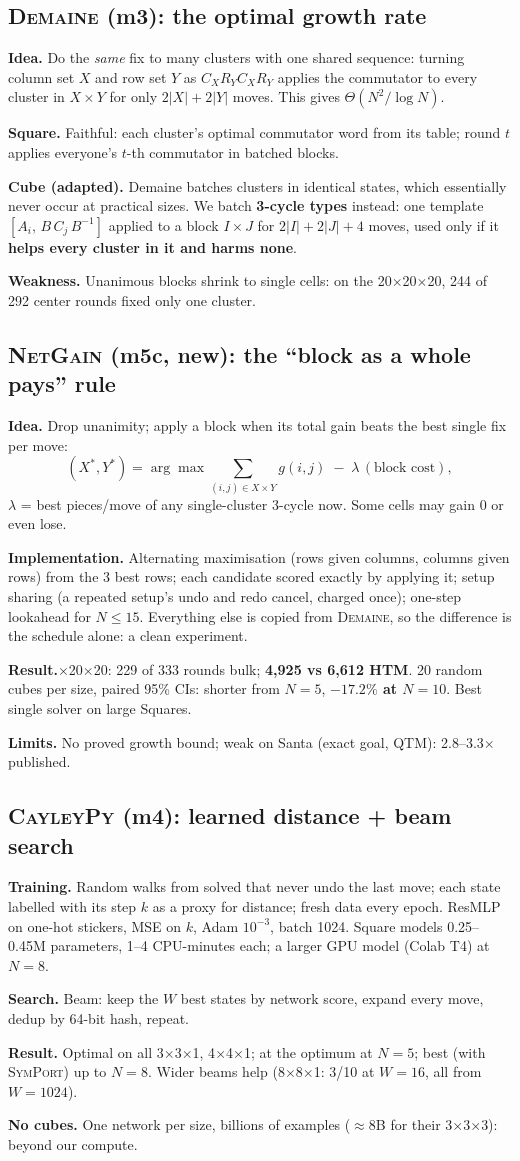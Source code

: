 \documentclass[10.5pt,a4paper]{article}
\newcommand{\Cu}[1]{#1$\times$#1$\times$#1}
\newcommand{\Sq}[1]{#1$\times$#1$\times$1}
\newcommand{\M}[1]{\textsc{#1}}
\newcommand{\sub}[1]{\par\smallskip\textbf{#1}\quad}
\begin{document}
\subsection{\M{Demaine} (m3): the optimal growth rate}
\sub{Idea.} Do the \emph{same} fix to many clusters with one shared sequence: turning column set $X$ and row set $Y$ as
$C_X R_Y C_X R_Y$ applies the commutator to every cluster in $X\times Y$ for only $2|X|+2|Y|$ moves. This gives
$\Theta(N^2/\log N)$.
\sub{Square.} Faithful: each cluster's optimal commutator word from its table; round $t$ applies everyone's $t$-th commutator in
batched blocks.
\sub{Cube (adapted).} Demaine batches clusters in identical states, which essentially never occur at practical sizes. We batch
\textbf{3-cycle types} instead: one template $[A_i,\,B\,C_j\,B^{-1}]$ applied to a block $I\times J$ for $2|I|+2|J|+4$ moves,
used only if it \textbf{helps every cluster in it and harms none}.
\sub{Weakness.} Unanimous blocks shrink to single cells: on the \Cu{20}, 244 of 292 center rounds fixed only one cluster.

\subsection{\M{NetGain} (m5c, new): the ``block as a whole pays'' rule}
\sub{Idea.} Drop unanimity; apply a block when its total gain beats the best single fix per move:
\[(X^\ast,Y^\ast)=\arg\max\sum_{(i,j)\in X\times Y} g(i,j)\;-\;\lambda\,(\text{block cost}),\]
$\lambda$ = best pieces/move of any single-cluster 3-cycle now. Some cells may gain 0 or even lose.
\sub{Implementation.} Alternating maximisation (rows given columns, columns given rows) from the 3 best rows; each candidate
scored exactly by applying it; setup sharing (a repeated setup's undo and redo cancel, charged once); one-step lookahead for
$N\le15$. Everything else is copied from \M{Demaine}, so the difference is the schedule alone: a clean experiment.
\sub{Result.} \Cu{20}: 229 of 333 rounds bulk; \textbf{4,925 vs 6,612 HTM}. 20 random cubes per size, paired 95\% CIs: shorter
from $N=5$, \textbf{$-17.2\%$ at $N=10$}. Best single solver on large Squares.
\sub{Limits.} No proved growth bound; weak on Santa (exact goal, QTM): 2.8--3.3$\times$ published.

\subsection{\M{CayleyPy} (m4): learned distance + beam search}
\sub{Training.} Random walks from solved that never undo the last move; each state labelled with its step $k$ as a proxy for
distance; fresh data every epoch. ResMLP on one-hot stickers, MSE on $k$, Adam $10^{-3}$, batch 1024. Square models 0.25--0.45M
parameters, 1--4 CPU-minutes each; a larger GPU model (Colab T4) at $N=8$.
\sub{Search.} Beam: keep the $W$ best states by network score, expand every move, dedup by 64-bit hash, repeat.
\sub{Result.} Optimal on all \Sq{3}, \Sq{4}; at the optimum at $N=5$; best (with \M{SymPort}) up to $N=8$. Wider beams help
(\Sq{8}: 3/10 at $W=16$, all from $W=1024$).
\sub{No cubes.} One network per size, billions of examples ($\approx$8B for their \Cu{3}): beyond our compute.
\end{document}

